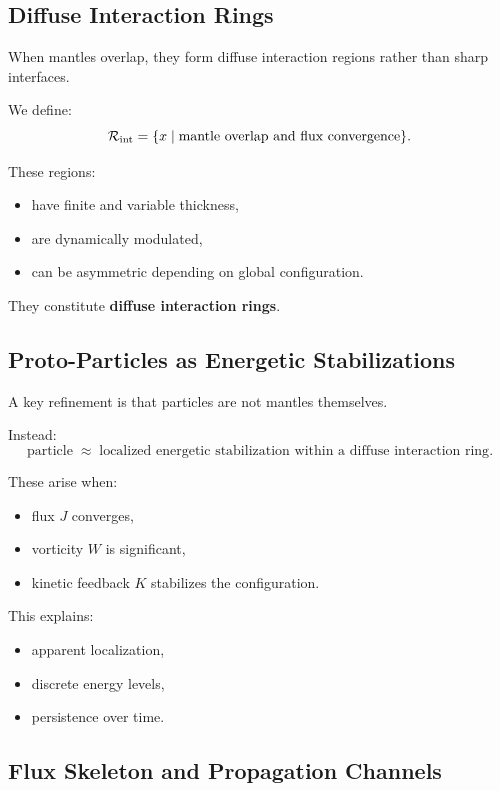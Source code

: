 \documentclass[11pt]{article}
\begin{document}
\subsection{Diffuse Interaction Rings}

When mantles overlap, they form diffuse interaction regions rather than sharp interfaces.

We define:
\begin{equation}
\mathcal{R}_{\rm int} = \{ x \mid \text{mantle overlap and flux convergence} \}.
\end{equation}

These regions:
\begin{itemize}
\item have finite and variable thickness,
\item are dynamically modulated,
\item can be asymmetric depending on global configuration.
\end{itemize}

They constitute \textbf{diffuse interaction rings}.

\subsection{Proto-Particles as Energetic Stabilizations}

A key refinement is that particles are not mantles themselves.

Instead:
\begin{equation}
\text{particle} \;\approx\; \text{localized energetic stabilization within a diffuse interaction ring}.
\end{equation}

These arise when:
\begin{itemize}
\item flux $J$ converges,
\item vorticity $W$ is significant,
\item kinetic feedback $K$ stabilizes the configuration.
\end{itemize}

This explains:
\begin{itemize}
\item apparent localization,
\item discrete energy levels,
\item persistence over time.
\end{itemize}

\subsection{Flux Skeleton and Propagation Channels}
\end{document}

